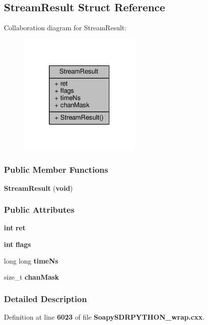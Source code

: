 \subsection{Stream\+Result Struct Reference}
\label{structStreamResult}


Collaboration diagram for Stream\+Result\+:
\nopagebreak
\begin{figure}[H]
\begin{center}
\leavevmode
\includegraphics[width=172pt]{d1/dcc/structStreamResult__coll__graph}
\end{center}
\end{figure}
\subsubsection*{Public Member Functions}
\begin{DoxyCompactItemize}
\item 
{\bf Stream\+Result} ({\bf void})
\end{DoxyCompactItemize}
\subsubsection*{Public Attributes}
\begin{DoxyCompactItemize}
\item 
{\bf int} {\bf ret}
\item 
{\bf int} {\bf flags}
\item 
long long {\bf time\+Ns}
\item 
size\+\_\+t {\bf chan\+Mask}
\end{DoxyCompactItemize}


\subsubsection{Detailed Description}


Definition at line {\bf 6023} of file {\bf Soapy\+S\+D\+R\+P\+Y\+T\+H\+O\+N\+\_\+wrap.\+cxx}.



